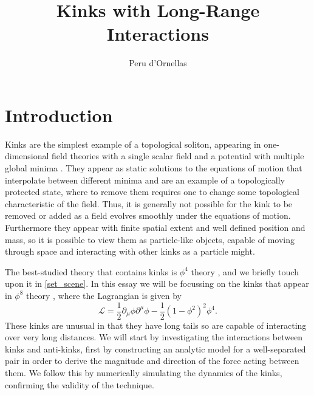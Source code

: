 \documentclass[11pt, oneside]{article}  	%
\title{Kinks with Long-Range Interactions}
\author{Peru d'Ornellas}
\date{}							%
\numberwithin{equation}{section}
\begin{document}
\maketitle


\section{Introduction}
Kinks are the simplest example of a topological soliton, appearing in one-dimensional field theories with a single scalar field and a potential with multiple global minima \cite{manton-book,rajaraman}. They appear as static solutions to the equations of motion that interpolate between different minima and are an example of a topologically protected state, where to remove them requires one to change some topological characteristic of the field. Thus, it is generally not possible for the kink to be removed or added as a field evolves smoothly under the equations of motion. Furthermore they appear with finite spatial extent and well defined position and mass, so it is possible to view them as particle-like objects, capable of moving through space and interacting with other kinks as a particle might.\par
The best-studied theory that contains kinks is $\phi^4$ theory \cite{kink-review,lohe,Goodman}, and we briefly touch upon it in \textsection \ref{set_scene}. In this essay we will be focussing on the kinks that appear in $\phi^8$ theory \cite{manton-paper,christov-proper}, where the Lagrangian is given by 
\begin{equation}
\mathcal{L} = \frac{1}{2} \partial_\mu \phi \partial^\mu \phi  - \frac{1}{2} \left ( 1- \phi^2 \right )^2 \phi^4.
\end{equation}
These kinks are unusual in that they have long tails so are capable of interacting over very long distances. We will start by investigating the interactions between kinks and anti-kinks, first by constructing an analytic model for a well-separated pair in order to derive the magnitude and direction of the force acting between them. We follow this by numerically simulating the dynamics of the kinks, confirming the validity of the technique.\par
\end{document}
